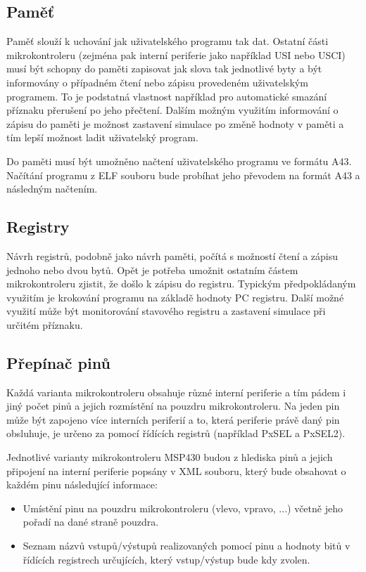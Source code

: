 \subsection{Paměť}

Paměť slouží k uchování jak uživatelského programu tak dat. Ostatní části mikrokontroleru (zejména pak interní periferie jako například USI nebo USCI) musí být schopny do paměti zapisovat jak slova tak jednotlivé byty a být informovány o případném čtení nebo zápisu provedeném uživatelským programem. To je podstatná vlastnost například pro automatické smazání příznaku přerušení po jeho přečtení. Dalším možným využitím informování o zápisu do paměti je možnost zastavení simulace po změně hodnoty v paměti a tím lepší možnost ladit uživatelský program.

Do paměti musí být umožněno načtení uživatelského programu ve formátu A43. Načítání programu z ELF souboru bude probíhat jeho převodem na formát A43 a následným načtením.

\subsection{Registry}

Návrh registrů, podobně jako návrh paměti, počítá s možností čtení a zápisu jednoho nebo dvou bytů. Opět je potřeba umožnit ostatním částem mikrokontroleru zjistit, že došlo k zápisu do registru. Typickým předpokládaným využitím je krokování programu na základě hodnoty PC registru. Další možné využití může být monitorování stavového registru a zastavení simulace při určitém příznaku.

\subsection{Přepínač pinů}

Každá varianta mikrokontroleru obsahuje různé interní periferie a tím pádem i jiný počet pinů a jejich rozmístění na pouzdru mikrokontroleru. Na jeden pin může být zapojeno více interních periferií a to, která periferie právě daný pin obsluhuje, je určeno za pomocí řídících registrů (například PxSEL a PxSEL2).

Jednotlivé varianty mikrokontroleru MSP430 budou z hlediska pinů a jejich připojení na interní periferie popsány v XML souboru, který bude obsahovat o každém pinu následující informace:

\begin{itemize}
\item Umístění pinu na pouzdru mikrokontroleru (vlevo, vpravo, ...) včetně jeho pořadí na dané straně pouzdra.
\item Seznam názvů vstupů/výstupů realizovaných pomocí pinu a hodnoty bitů v řídících registrech určujících, který vstup/výstup bude kdy zvolen.
\end{itemize}

